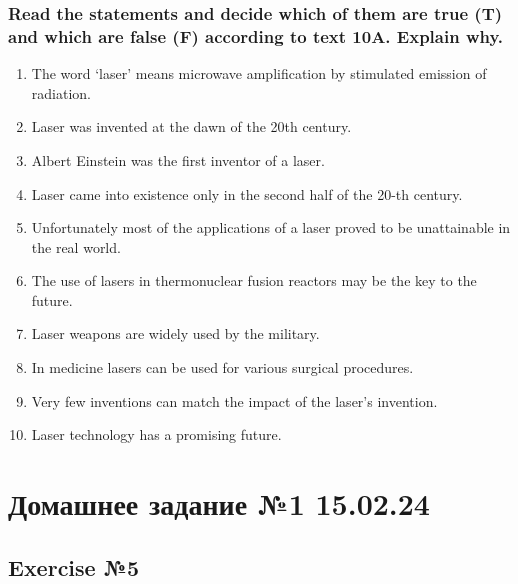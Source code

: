 \subsection*{Read the statements and decide which of them are true (T) and
      which are false (F) according to text 10A. Explain why.}
\begin{enumerate}
      \item The word ‘laser’ means microwave amplification by stimulated emission
            of radiation.
      \item Laser was invented at the dawn of the 20th century.
      \item Albert Einstein was the first inventor of a laser.
      \item Laser came into existence only in the second half of the 20-th century.
      \item Unfortunately most of the applications of a laser proved to be unattainable
            in the real world.
      \item The use of lasers in thermonuclear fusion reactors may be the key
            to the future.
      \item Laser weapons are widely used by the military.
      \item In medicine lasers can be used for various surgical procedures.
      \item Very few inventions can match the impact of the laser’s invention.
      \item Laser technology has a promising future.
\end{enumerate}

\chapter{Домашнее задание №1 15.02.24}

\section*{Exercise №5}

